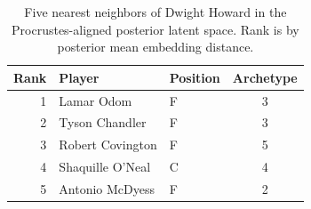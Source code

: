 \begin{table}[htbp]
  \centering\small
  \begin{tabular}{rllc}
    \toprule
    Rank & Player & Position & Archetype \\
    \midrule
    1 & Lamar Odom & F & 3 \\
    2 & Tyson Chandler & F & 3 \\
    3 & Robert Covington & F & 5 \\
    4 & Shaquille O'Neal & C & 4 \\
    5 & Antonio McDyess & F & 2 \\
    \bottomrule
  \end{tabular}
  \caption{Five nearest neighbors of Dwight Howard in the Procrustes-aligned posterior latent space. Rank is by posterior mean embedding distance.}
  \label{tab:Dwight_Howard_neighbors}
\end{table}

